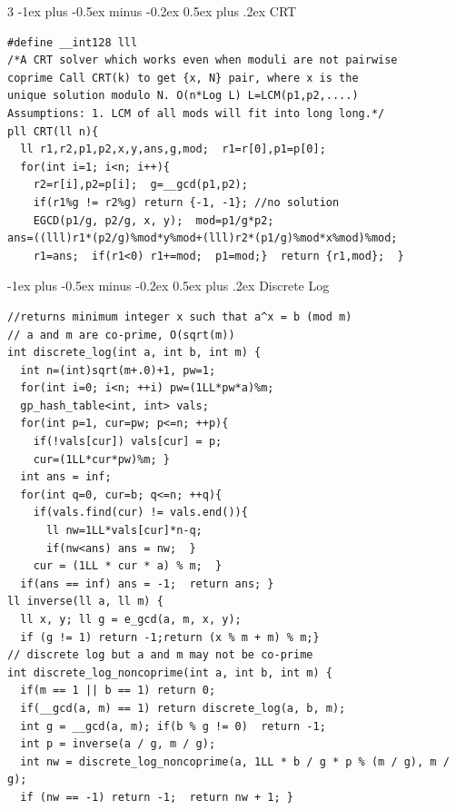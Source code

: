 \documentclass[8pt,a4paper,onesided]{article}
\makeatletter
\renewcommand{\subsection}{\@startsection{subsection}{2}{0mm}
    {-1ex plus -0.5ex minus -0.2ex} %
    {0.5ex plus .2ex}                %
    {\normalfont\large\bfseries}}    %
\makeatother
\begin{document}
\begin{multicols}{3}
\subsection{CRT}
\begin{verbatim}
#define __int128 lll
/*A CRT solver which works even when moduli are not pairwise
coprime Call CRT(k) to get {x, N} pair, where x is the 
unique solution modulo N. O(n*Log L) L=LCM(p1,p2,....) 
Assumptions: 1. LCM of all mods will fit into long long.*/
pll CRT(ll n){
  ll r1,r2,p1,p2,x,y,ans,g,mod;  r1=r[0],p1=p[0];
  for(int i=1; i<n; i++){
    r2=r[i],p2=p[i];  g=__gcd(p1,p2);
    if(r1%g != r2%g) return {-1, -1}; //no solution
    EGCD(p1/g, p2/g, x, y);  mod=p1/g*p2;
ans=((lll)r1*(p2/g)%mod*y%mod+(lll)r2*(p1/g)%mod*x%mod)%mod;
    r1=ans;  if(r1<0) r1+=mod;  p1=mod;}  return {r1,mod};  }
\end{verbatim}
\subsection{Discrete Log}
\begin{verbatim}
//returns minimum integer x such that a^x = b (mod m)
// a and m are co-prime, O(sqrt(m))
int discrete_log(int a, int b, int m) {
  int n=(int)sqrt(m+.0)+1, pw=1;
  for(int i=0; i<n; ++i) pw=(1LL*pw*a)%m;
  gp_hash_table<int, int> vals;
  for(int p=1, cur=pw; p<=n; ++p){
    if(!vals[cur]) vals[cur] = p;
    cur=(1LL*cur*pw)%m; }
  int ans = inf;
  for(int q=0, cur=b; q<=n; ++q){
    if(vals.find(cur) != vals.end()){
      ll nw=1LL*vals[cur]*n-q;
      if(nw<ans) ans = nw;  }
    cur = (1LL * cur * a) % m;  }
  if(ans == inf) ans = -1;  return ans; }
ll inverse(ll a, ll m) {
  ll x, y; ll g = e_gcd(a, m, x, y);
  if (g != 1) return -1;return (x % m + m) % m;}
// discrete log but a and m may not be co-prime
int discrete_log_noncoprime(int a, int b, int m) {
  if(m == 1 || b == 1) return 0;
  if(__gcd(a, m) == 1) return discrete_log(a, b, m);
  int g = __gcd(a, m); if(b % g != 0)  return -1;
  int p = inverse(a / g, m / g);
  int nw = discrete_log_noncoprime(a, 1LL * b / g * p % (m / g), m / g);
  if (nw == -1) return -1;  return nw + 1; }
\end{verbatim}

\end{multicols}
\end{document}
